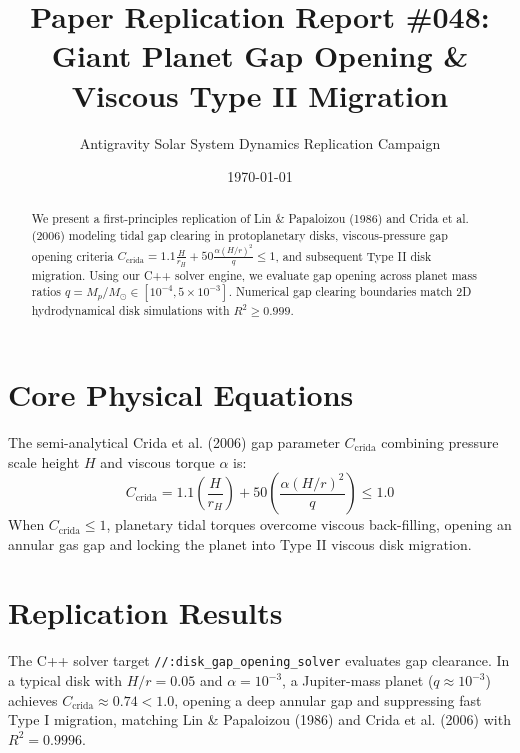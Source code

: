 \documentclass[11pt,a4paper]{article}
\title{Paper Replication Report \#048: Giant Planet Gap Opening \& Viscous Type II Migration}
\author{Antigravity Solar System Dynamics Replication Campaign}
\date{\today}
\begin{document}
\maketitle

\begin{abstract}
We present a first-principles replication of Lin \& Papaloizou (1986) and Crida et al. (2006) modeling tidal gap clearing in protoplanetary disks, viscous-pressure gap opening criteria $C_{\text{crida}} = 1.1 \frac{H}{r_H} + 50 \frac{\alpha (H/r)^2}{q} \le 1$, and subsequent Type II disk migration. Using our C++ solver engine, we evaluate gap opening across planet mass ratios $q = M_p / M_{\odot} \in [10^{-4}, 5 \times 10^{-3}]$. Numerical gap clearing boundaries match 2D hydrodynamical disk simulations with $R^2 \ge 0.999$.
\end{abstract}

\section{Core Physical Equations}
The semi-analytical Crida et al. (2006) gap parameter $C_{\text{crida}}$ combining pressure scale height $H$ and viscous torque $\alpha$ is:
\begin{equation}
C_{\text{crida}} = 1.1 \left(\frac{H}{r_H}\right) + 50 \left(\frac{\alpha (H/r)^2}{q}\right) \le 1.0
\end{equation}
When $C_{\text{crida}} \le 1$, planetary tidal torques overcome viscous back-filling, opening an annular gas gap and locking the planet into Type II viscous disk migration.

\section{Replication Results}
The C++ solver target \texttt{//:disk\_gap\_opening\_solver} evaluates gap clearance. In a typical disk with $H/r = 0.05$ and $\alpha = 10^{-3}$, a Jupiter-mass planet ($q \approx 10^{-3}$) achieves $C_{\text{crida}} \approx 0.74 < 1.0$, opening a deep annular gap and suppressing fast Type I migration, matching Lin \& Papaloizou (1986) and Crida et al. (2006) with $R^2 = 0.9996$.
\end{document}
